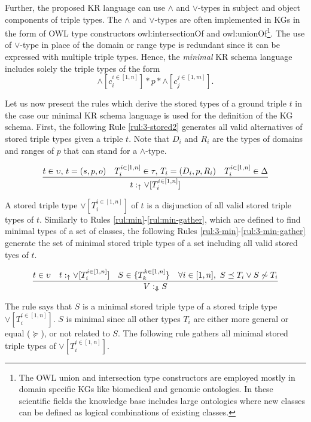 \documentclass[runningheads]{llncs}
\newcommand{\uarr}{\uparrow}
\newcommand{\Darr}{\Downarrow}
\begin{document}
Further, the proposed KR language can use $\land$ and $\lor$-types in
subject and object components of triple types. The $\land$ and
$\lor$-types are often implemented in KGs in the form of OWL type
constructors owl:intersectionOf and owl:unionOf\footnote{The OWL union
  and intersection type constructors are employed mostly in domain
  specific KGs like biomedical and genomic ontologies. In these
  scientific fields the knowledge base includes large ontologies where
  new classes can be defined as logical combinations of existing
  classes.}. The use of $\lor$-type in place of the domain or range
type is redundant since it can be expressed with multiple triple
types. Hence, the \emph{minimal} KR schema language includes solely
the triple types of the form
$$\land[c_i^{i\in[1,n]}]*p*\land[c_j^{j\in[1,m]}].$$

Let us now present the rules which derive the stored types of a ground
triple $t$ in the case our minimal KR schema language is used for the
definition of the KG schema. First, the following Rule
\ref{rul:3-stored2} generates all valid alternatives of stored triple
types given a triple $t$. Note that $D_i$ and $R_i$ are the types of
domains and ranges of $p$ that can stand for a $\land$-type.

\begin{equation}
\label{rul:3-stored2}
\dfrac{t\in\upsilon,\, t=(s,p,o)\quad T_i^{i\in[1,n]}\in\tau,\, T_i=(D_i,p,R_i)\quad\/T_i^{i\in[1,n]}\in\Delta}
      {t:_\uarr\/\lor[T_i^{i\in[1,n]}]}
\end{equation}

A stored triple type $\lor[T_i^{i\in[1,n]}]$ of $t$ is a disjunction
of all valid stored triple types of $t$. Similarly to Rules
\ref{rul:min}-\ref{rul:min-gather}, which are defined to find minimal
types of a set of classes, the following Rules
\ref{rul:3-min}-\ref{rul:3-min-gather} generate the set of minimal
stored triple types of a set including all valid stored tyes of $t$.

\begin{equation}
\label{rul:3-min}
\dfrac{t\in\upsilon\quad\/t:_\uarr\lor[T_i^{i\in[1,n]}]\quad\/S\in\/\{T_k^{k\in[1,n]}\}\quad\forall\/i\in[1,n],\ S\preceq\/T_i\lor\/S\not\sim\/T_i}
      {V:_{\Darr}S}
\end{equation}

The rule says that $S$ is a minimal stored triple type of a stored
triple type $\lor[T_i^{i\in[1,n]}]$. $S$ is minimal since all other
types $T_i$ are either more general or equal ($\succeq$), or not
related to $S$. The following rule gathers all minimal stored triple
types of $\lor[T_i^{i\in[1,n]}]$.
\end{document}

